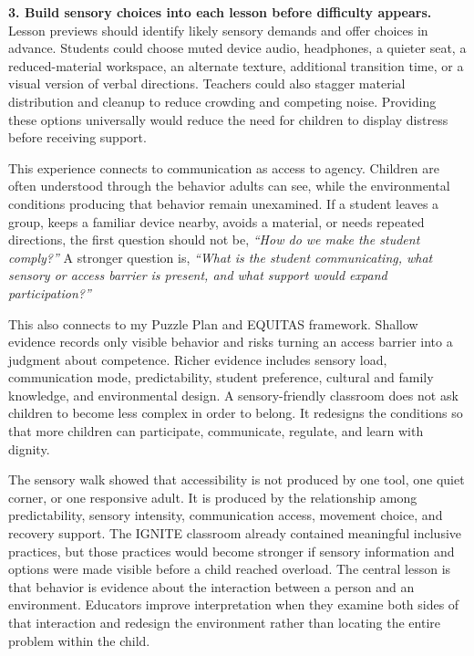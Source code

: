 \documentclass[11pt]{article}
\newcommand{\reviewsection}[1]{\vspace{0.07in}\noindent{\normalsize\bfseries\color{PrimaryRed}#1}\par\vspace{0.02in}}
\begin{document}
\textbf{3. Build sensory choices into each lesson before difficulty appears.} Lesson previews should identify likely sensory demands and offer choices in advance. Students could choose muted device audio, headphones, a quieter seat, a reduced-material workspace, an alternate texture, additional transition time, or a visual version of verbal directions. Teachers could also stagger material distribution and cleanup to reduce crowding and competing noise. Providing these options universally would reduce the need for children to display distress before receiving support.


This experience connects to communication as access to agency. Children are often understood through the behavior adults can see, while the environmental conditions producing that behavior remain unexamined. If a student leaves a group, keeps a familiar device nearby, avoids a material, or needs repeated directions, the first question should not be, \textit{``How do we make the student comply?''} A stronger question is, \textit{``What is the student communicating, what sensory or access barrier is present, and what support would expand participation?''}

This also connects to my Puzzle Plan and EQUITAS framework. Shallow evidence records only visible behavior and risks turning an access barrier into a judgment about competence. Richer evidence includes sensory load, communication mode, predictability, student preference, cultural and family knowledge, and environmental design. A sensory-friendly classroom does not ask children to become less complex in order to belong. It redesigns the conditions so that more children can participate, communicate, regulate, and learn with dignity.

\reviewsection{Conclusion}

The sensory walk showed that accessibility is not produced by one tool, one quiet corner, or one responsive adult. It is produced by the relationship among predictability, sensory intensity, communication access, movement choice, and recovery support. The IGNITE classroom already contained meaningful inclusive practices, but those practices would become stronger if sensory information and options were made visible before a child reached overload. The central lesson is that behavior is evidence about the interaction between a person and an environment. Educators improve interpretation when they examine both sides of that interaction and redesign the environment rather than locating the entire problem within the child.
\end{document}
